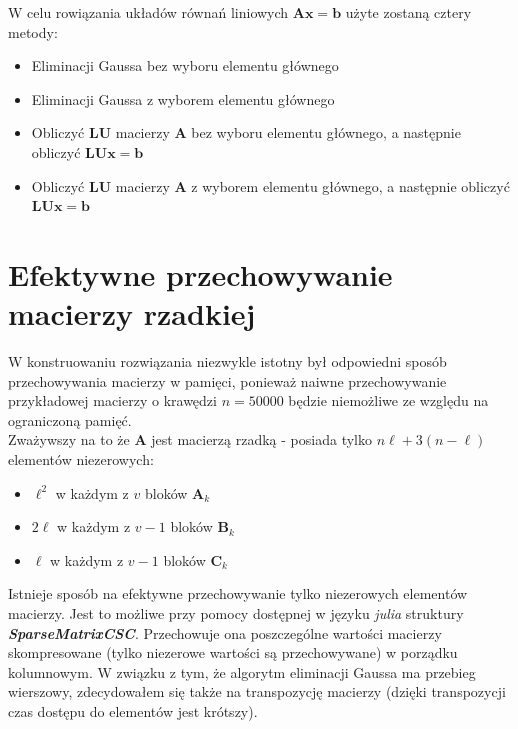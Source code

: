 \documentclass{article}
\newcommand{\mA}{\bm{A}}
\newcommand{\mB}{\bm{B}}
\newcommand{\mC}{\bm{C}}
\newcommand{\mL}{\bm{L}}
\newcommand{\mU}{\bm{U}}
\newcommand{\vb}{\bm{b}}
\newcommand{\vx}{\bm{x}}
\begin{document}
\noindent W celu rowiązania układów równań liniowych $\mA\vx  = \vb$ użyte zostaną cztery metody:
\begin{itemize}
	\item Eliminacji Gaussa bez wyboru elementu głównego
	\item Eliminacji Gaussa z wyborem elementu głównego
	\item Obliczyć $\mL\mU$ macierzy $\mA$ bez wyboru elementu głównego, a następnie obliczyć $\mL\mU\vx = \vb$
	\item Obliczyć $\mL\mU$ macierzy $\mA$ z wyborem elementu głównego, a następnie obliczyć $\mL\mU\vx = \vb$
\end{itemize}
\newpage
\section*{Efektywne przechowywanie macierzy rzadkiej}
W konstruowaniu rozwiązania niezwykle istotny był odpowiedni sposób przechowywania macierzy w pamięci, ponieważ naiwne przechowywanie przykładowej macierzy o krawędzi $n=50000$ będzie niemożliwe ze względu na ograniczoną pamięć.\\

\noindent Zważywszy na to że $\mA$ jest macierzą rzadką -  posiada tylko $n\ell+3(n-\ell)$ elementów niezerowych:
\begin{itemize}
	\item $\ell^2$ w każdym z $v$ bloków $\mA_k$
	\item $2\ell$ w każdym z $v-1$ bloków $\mB_k$
	\item $\ell$ w każdym z $v-1$ bloków $\mC_k$
\end{itemize}
Istnieje sposób na efektywne przechowywanie tylko niezerowych elementów macierzy. Jest to możliwe przy pomocy dostępnej w języku \textit{julia} struktury \textit{\textbf{SparseMatrixCSC}}. Przechowuje ona poszczególne wartości macierzy skompresowane (tylko niezerowe wartości są przechowywane) w porządku kolumnowym. W związku z tym, że algorytm eliminacji Gaussa ma przebieg wierszowy, zdecydowałem się także na transpozycję macierzy (dzięki transpozycji czas dostępu do elementów jest krótszy).
\end{document}
